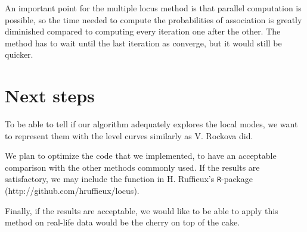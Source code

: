 \documentclass[a4paper, 11pt]{report}
\numberwithin{equation}{chapter}
\begin{document}
An important point for the multiple locus method is that parallel computation is possible, so the time needed to compute the probabilities of association is greatly diminished compared to computing every iteration one after the other. The method has to wait until the last iteration as converge, but it would still be quicker.

\section{Next steps}
To be able to tell if our algorithm adequately explores the local modes, we want to represent them with the level curves similarly as V. Rockova \cite{rockova} did.

We plan to optimize the code that we implemented, to have an acceptable comparison with the other methods commonly used. If the results are satisfactory, we may include the function in H. Ruffieux's \texttt{R}-package (http://github.com/hruffieux/locus).

Finally, if the results are acceptable, we would like to be able to apply this method on real-life data would be the cherry on top of the cake.
\newpage


\end{document}
